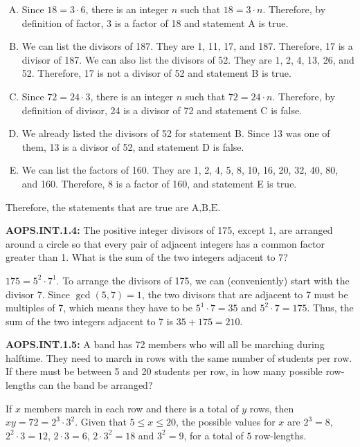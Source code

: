 \documentclass[11pt]{article}
\newenvironment{uzdevums}[1][\unskip]{%
\vspace{3mm}
\noindent
\textbf{#1:}
\noindent}
{}
\begin{document}
\begin{enumerate}[A.]
\item Since $18=3\cdot 6$, there is an integer $n$ such that $18=3\cdot n$. Therefore, by definition of factor, 3 is a factor of 18 and statement A is true.
\item We can list the divisors of 187. They are 1, 11, 17, and 187. Therefore, 17 is a divisor of 187. We can also list the divisors of 52. They are 1, 2, 4, 13, 26, and 52. Therefore, 17 is not a divisor of 52 and statement B is true.
\item Since $72=24\cdot 3$, there is an integer $n$ such that $72=24\cdot n$. Therefore, by definition of divisor, 24 is a divisor of 72 and statement C is false.
\item We already listed the divisors of 52 for statement B. Since 13 was one of them, 13 is a divisor of 52, and statement D is false.
\item We can list the factors of 160. They are 1, 2, 4, 5, 8, 10, 16, 20, 32, 40, 80, and 160. Therefore, 8 is a factor of 160, and statement E is true.
\end{enumerate}

Therefore, the statements that are true are $\boxed{\text{A,B,E}}$.

\begin{uzdevums}[AOPS.INT.1.4]
The positive integer divisors of 175, except 1, are arranged around a circle so that 
every pair of adjacent integers has a common factor greater than 1. 
What is the sum of the two integers adjacent to 7?
\end{uzdevums}

$175=5^2\cdot7^1$. To arrange the divisors of 175, we can (conveniently) start with the divisor 7. Since $\gcd(5,7)=1$, the two divisors that are adjacent to 7 must be multiples of 7, which means they have to be $5^1\cdot7=35$ and $5^2\cdot7=175$. Thus, the sum of the two integers adjacent to 7 is $35+175=\boxed{210}$.

\begin{uzdevums}[AOPS.INT.1.5]
A band has 72 members who will all be marching during halftime. They need to march in rows with the same number of students per row. If there must be between 5 and 20 students per row, in how many possible row-lengths can the band be arranged?
\end{uzdevums}

If $x$ members march in each row and there is a total of $y$ rows, then $xy=72=2^3\cdot3^2$. Given that $5\le x\le20$, the possible values for $x$ are $2^3=8$, $2^2\cdot3=12$, $2\cdot3=6$, $2\cdot3^2=18$ and $3^2=9$, for a total of $ \boxed{5}$ row-lengths.
\end{document}
